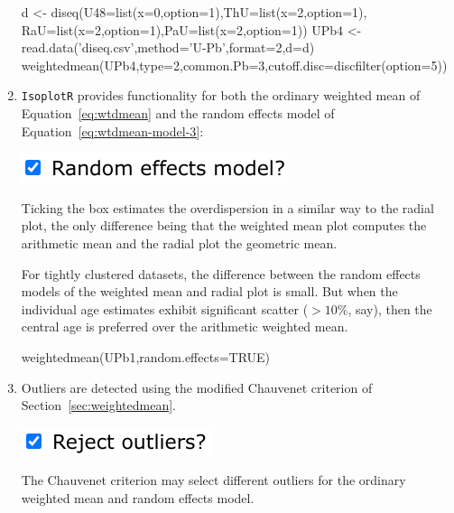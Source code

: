 \begin{refsection}
\begin{enumerate}
\begin{script}
d <- diseq(U48=list(x=0,option=1),ThU=list(x=2,option=1),
           RaU=list(x=2,option=1),PaU=list(x=2,option=1))
UPb4 <- read.data('diseq.csv',method='U-Pb',format=2,d=d)
weightedmean(UPb4,type=2,common.Pb=3,cutoff.disc=discfilter(option=5))
\end{script}

\item \texttt{IsoplotR} provides functionality for both the ordinary
  weighted mean of Equation~\ref{eq:wtdmean} and the random effects
  model of Equation~\ref{eq:wtdmean-model-3}:

\noindent\begin{minipage}[t]{.3\linewidth}
\strut\vspace*{-\baselineskip}\newline
\includegraphics[width=\linewidth]{../figures/UPbWtdMeanRandomEffects.png}
\end{minipage}
\begin{minipage}[t]{.7\linewidth}
  Ticking the box estimates the overdispersion in a similar way to the
  radial plot, the only difference being that the weighted mean plot
  computes the arithmetic mean and the radial plot the geometric mean.
\end{minipage}

For tightly clustered datasets, the difference between the random
effects models of the weighted mean and radial plot is small.  But
when the individual age estimates exhibit significant scatter
($>10$\%, say), then the central age is preferred over the arithmetic
weighted mean.

\begin{console}
weightedmean(UPb1,random.effects=TRUE)
\end{console}
  
\item Outliers are detected using the modified Chauvenet criterion of
  Section~\ref{sec:weightedmean}.

\noindent\begin{minipage}[t]{.22\linewidth}
\strut\vspace*{-\baselineskip}\newline
\includegraphics[width=\linewidth]{../figures/UPbWtdMeanOutliers.png}
\end{minipage}
\begin{minipage}[t]{.78\linewidth}
  The Chauvenet criterion may select different outliers for the
  ordinary weighted mean and random effects model.
\end{minipage}


\end{enumerate}
\end{refsection}
